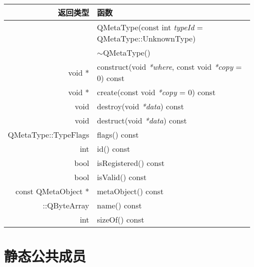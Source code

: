 \begin{longtable}{|r|m{28em}|}   
\hline
返回类型 	& 函数 \\
\hline
& QMetaType(const int \emph{typeId} = QMetaType::UnknownType) \\ 
\hline
& $\sim$QMetaType() \\
\hline
void *	&construct(void \emph{*where}, const void \emph{*copy} = 0) const \\
\hline
void *	&create(const void \emph{*copy} = 0) const \\
\hline
void	&destroy(void \emph{*data}) const \\
\hline
void	&destruct(void \emph{*data}) const \\
\hline
QMetaType::TypeFlags &	flags() const \\
\hline
int	& id() const \\ 
\hline
bool	&isRegistered() const \\
\hline
bool	&isValid() const \\
\hline
const QMetaObject *	& metaObject() const \\
\hline
::QByteArray &	name() const \\
\hline
int	& sizeOf() const \\
\hline
\end{longtable}

\section{静态公共成员}

